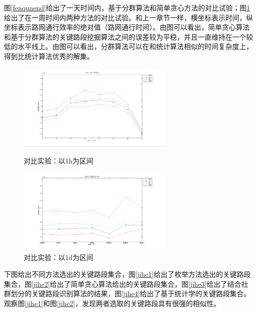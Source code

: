 		图\ref{fenqunend}给出了一天时间内，基于分群算法和简单贪心方法的对比试验；图\ref{end}给出了在一周时间内两种方法的对比试验。和上一章节一样，横坐标表示时间，纵坐标表示路网通行效率的绝对值（路网通行时间）。由图可以看出，简单贪心算法和基于分群算法的关键路段挖掘算法之间的误差较为平稳，并且一直维持在一个较低的水平线上。由图可以看出，分群算法可以在和统计算法相似的时间复杂度上，得到比统计算法优秀的解集。

				\begin{figure}
				\begin{minipage}{0.5\linewidth}
					\centering
					\includegraphics[width=3in]{picture/fenqunend}
					\caption{对比实验：以1h为区间}
					\label{fenqunend}
				\end{minipage}%
				\begin{minipage}{0.5\linewidth}
					\centering
					\includegraphics[width=3in]{picture/end}
					\caption{对比实验：以1d为区间}
					\label{end}
				\end{minipage}
				\end{figure}

		下图给出不同方法选出的关键路段集合，图\ref{jihe1}给出了枚举方法选出的关键路段集合，图\ref{jihe2}给出了简单贪心算法给出的关键路段集合，图\ref{jihe3}给出了结合社群划分的关键路段识别算法的结果，图\ref{jihe4}给出了基于统计学的关键路段集合。观察图\ref{jihe1}和图\ref{jihe2}，发现两者选取的关键路段具有很强的相似性。

